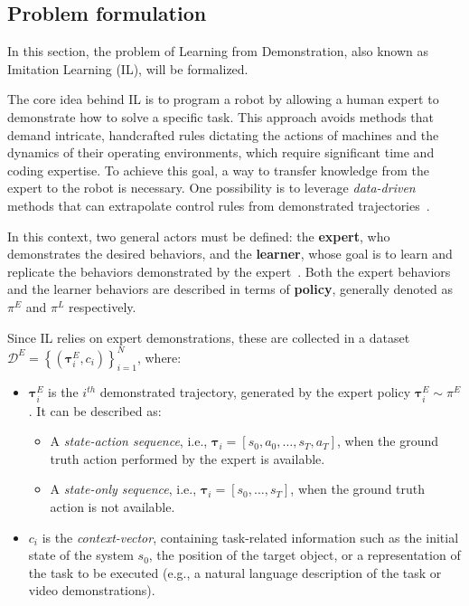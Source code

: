 \subsection{Problem formulation}
\label{sec:problem_formulation}
In this section, the problem of Learning from Demonstration, also known as Imitation Learning (IL), will be formalized.

The core idea behind IL is to program a robot by allowing a human expert to demonstrate how to solve a specific task. This approach avoids methods that demand intricate, handcrafted rules dictating the actions of machines and the dynamics of their operating environments, which require significant time and coding expertise. To achieve this goal, a way to transfer knowledge from the expert to the robot is necessary. One possibility is to leverage \textit{data-driven} methods that can extrapolate control rules from demonstrated trajectories~\cite{osa2018algorithmic}.

In this context, two general actors must be defined: the \textbf{expert}, who demonstrates the desired behaviors, and the \textbf{learner}, whose goal is to learn and replicate the behaviors demonstrated by the expert~\cite{osa2018algorithmic,zare2024survey}. Both the expert behaviors and the learner behaviors are described in terms of \textbf{policy}, generally denoted as $\pi^{E}$ and $\pi^{L}$ respectively.

Since IL relies on expert demonstrations, these are collected in a dataset $\mathcal{D}^{E}=\left\{\left(\boldsymbol{\tau}^{E}_{i}, c_{i}\right)\right\}_{i=1}^{N}$, where:
\begin{itemize}[noitemsep]
    \item $\boldsymbol{\tau}^{E}_{i}$ is the $i^{th}$ demonstrated trajectory, generated by the expert policy $\boldsymbol{\tau}^{E}_{i}\sim\pi^{E}$. It can be described as:
        \begin{itemize}[noitemsep]
            \item A \textit{state-action sequence}, i.e., $\boldsymbol{\tau}_{i} = [s_{0}, a_{0}, \dots, s_{T}, a_{T}]$, when the ground truth action performed by the expert is available.
            \item A \textit{state-only sequence}, i.e., $\boldsymbol{\tau}_{i} = [s_{0}, \dots, s_{T}]$, when the ground truth action is not available.
        \end{itemize}
    \item $c_{i}$ is the \textit{context-vector}, containing task-related information such as the initial state of the system $s_{0}$, the position of the target object, or a representation of the task to be executed (e.g., a natural language description of the task or video demonstrations).
\end{itemize}

